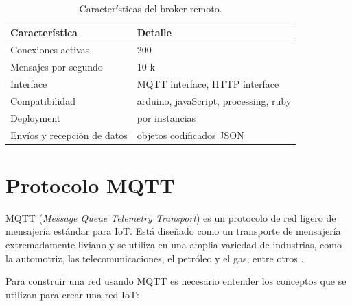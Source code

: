 \begin{table}[h]
	\centering
	\caption[Características del broker remoto]{Características del broker remoto.}
	\begin{tabular}{p{5cm} p{7cm} }    
		\toprule
		\textbf{Característica} 	 & \textbf{Detalle}  \\
		\midrule
		Conexiones activas  & 200\\		
		Mensajes por segundo & 10 k \\
		Interface  & MQTT interface, HTTP interface\\		
		Compatibilidad & arduino, javaScript, processing, ruby \\		
		Deployment 	  & por instancias\\
		Envíos y recepción de datos & objetos codificados JSON\\
		
		\bottomrule
		\hline
	\end{tabular}
	\label{tab:brokerremoto}
\end{table}










\section{Protocolo MQTT}

MQTT  (\textit{Message Queue Telemetry Transport}) es un protocolo de red ligero de mensajería estándar para IoT. Está diseñado como un transporte de mensajería extremadamente liviano y se utiliza en una amplia variedad de industrias, como la automotriz, las telecomunicaciones, el petróleo y el gas, entre otros  \citep{WEBSITE:4}. 

Para construir una red usando MQTT es necesario entender los conceptos que se utilizan para crear una red IoT: 

